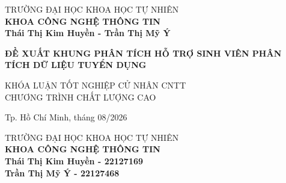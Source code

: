 \begin{titlepage}

\begin{center}
TRƯỜNG ĐẠI HỌC KHOA HỌC TỰ NHIÊN\\
\textbf{KHOA CÔNG NGHỆ THÔNG TIN}\\[2cm]


{ \Large \bfseries Thái Thị Kim Huyền - Trần Thị Mỹ Ý\\[2cm] } 


{ \Large \bfseries ĐỀ XUẤT KHUNG PHÂN TÍCH HỖ TRỢ SINH VIÊN PHÂN TÍCH DỮ LIỆU TUYỂN DỤNG \\[3cm]} 


\large KHÓA LUẬN TỐT NGHIỆP CỬ NHÂN CNTT\\
\large CHƯƠNG TRÌNH CHẤT LƯỢNG CAO\\



\vfill
Tp. Hồ Chí Minh, tháng 08/2026

\end{center}

\pagebreak



\begin{center}

TRƯỜNG ĐẠI HỌC KHOA HỌC TỰ NHIÊN\\
\textbf{KHOA CÔNG NGHỆ THÔNG TIN}\\[2cm]


{\large \bfseries Thái Thị Kim Huyền - 22127169\\} 
{\large \bfseries Trần Thị Mỹ Ý - 22127468\\[2cm]}



\end{center}
\end{titlepage}
